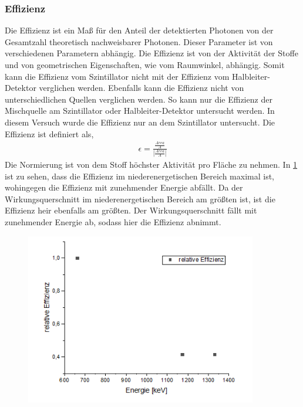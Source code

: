 \subsubsection{Effizienz}
Die Effizienz ist ein Maß für den Anteil der detektierten Photonen von der Gesamtzahl theoretisch nachweisbarer Photonen. Dieser Parameter ist von verschiedenen Parametern abhängig. Die Effizienz ist von der Aktivität der Stoffe und von geometrischen Eigenschaften, wie vom Raumwinkel, abhängig. Somit kann die Effizienz vom Szintillator nicht mit der Effizienz vom Halbleiter-Detektor verglichen werden. Ebenfalls kann die Effizienz nicht von unterschiedlichen Quellen verglichen werden. So kann nur die Effizienz der Mischquelle am Szintillator oder Halbleiter-Detektor untersucht werden. In diesem Versuch wurde die Effizienz nur an dem Szintillator untersucht. Die Effizienz ist definiert als, 
\begin{align}
	\epsilon = \frac{\frac{Area}{A}}{|\frac{Area}{A}|}
\end{align}
Die Normierung ist von dem Stoff höchster Aktivität pro Fläche zu nehmen.
In \cref{eff} ist zu sehen, dass die Effizienz im niederenergetischen Bereich maximal ist, wohingegen die Effizienz mit zunehmender Energie abfällt. Da der Wirkungsquerschnitt im niederenergetischen Bereich am größten ist, ist die Effizienz heir ebenfalls am größten. Der Wirkungsquerschnitt fällt mit zunehmender Energie ab, sodass hier die Effizienz abnimmt.
\begin{figure}[h!]
	\centering
	\includegraphics[width=0.9\textwidth]{Effizienz.png}
	\caption{}
	\label{eff}
\end{figure}


